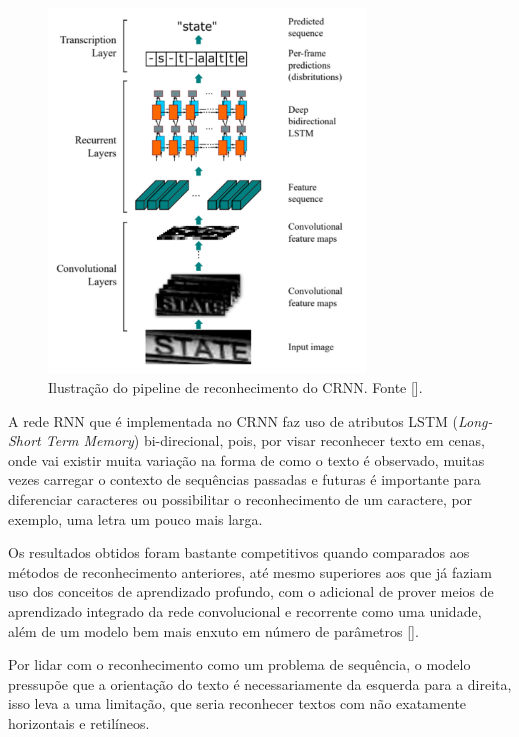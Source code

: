 \begin{figure}
    \centering
    \includegraphics[width=0.75\textwidth]{figs/crnn-pipeline.png}
    \caption{Ilustração do pipeline de reconhecimento do CRNN. Fonte [].}
    \label{fig:crnn_pipeline}
\end{figure}

A rede RNN que é implementada no CRNN faz uso de atributos LSTM (\textit{Long-Short Term Memory}) bi-direcional, pois, por visar reconhecer texto em cenas, onde vai existir muita variação na forma de como o texto é observado, muitas vezes carregar o contexto de sequências passadas e futuras é importante para diferenciar caracteres ou possibilitar o reconhecimento de um caractere, por exemplo, uma letra um pouco mais larga.

Os resultados obtidos foram bastante competitivos quando comparados aos métodos de reconhecimento anteriores, até mesmo superiores aos que já faziam uso dos conceitos de aprendizado profundo, com o adicional de prover meios de aprendizado integrado da rede convolucional e recorrente como uma unidade, além de um modelo bem mais enxuto em número de parâmetros [].

Por lidar com o reconhecimento como um problema de sequência, o modelo pressupõe que a orientação do texto é necessariamente da esquerda para a direita, isso leva a uma limitação, que seria reconhecer textos com não exatamente horizontais e retilíneos.

